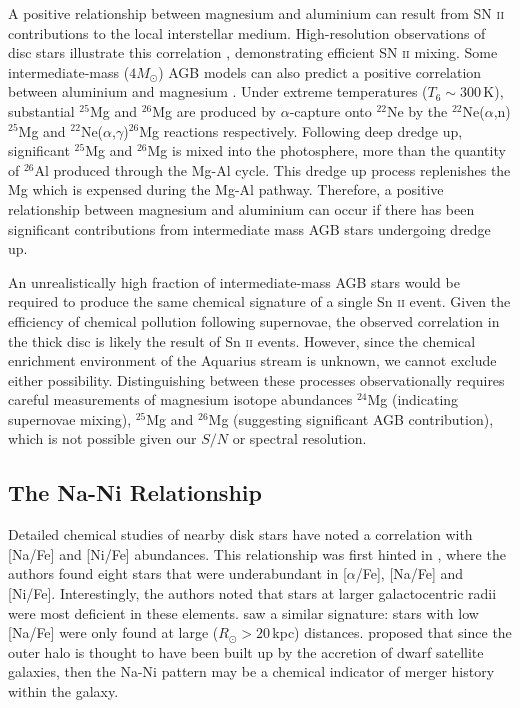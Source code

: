 \documentclass{emulateapj}
\begin{document}
A positive relationship between magnesium and aluminium can result from SN \textsc{ii} contributions to the local interstellar medium. High-resolution observations of disc stars illustrate this correlation \citep{bensby;venn}, demonstrating efficient SN \textsc{ii} mixing. Some intermediate-mass ($4M_\odot$) AGB models can also predict a positive correlation between aluminium and magnesium \citet{karakas;et-al}. Under extreme temperatures ($T_6 \sim 300$\,K), substantial $^{25}$Mg and $^{26}$Mg are produced by $\alpha$-capture onto $^{22}$Ne by the $^{22}$Ne($\alpha$,n)$^{25}$Mg and $^{22}$Ne($\alpha$,$\gamma$)$^{26}$Mg reactions respectively. Following deep dredge up, significant $^{25}$Mg and $^{26}$Mg is mixed into the photosphere, more than the quantity of $^{26}$Al produced through the Mg-Al cycle. This dredge up process replenishes the Mg which is expensed during the Mg-Al pathway. Therefore, a positive relationship between magnesium and aluminium can occur if there has been significant contributions from intermediate mass AGB stars undergoing dredge up. 



An unrealistically high fraction of intermediate-mass AGB stars would be required to produce the same chemical signature of a single Sn \textsc{ii} event. Given the efficiency of chemical pollution following supernovae, the observed correlation in the thick disc is likely the result of Sn \textsc{ii} events. However, since the chemical enrichment environment of the Aquarius stream is unknown, we cannot exclude either possibility. Distinguishing between these processes observationally requires careful measurements of magnesium isotope abundances $^{24}$Mg (indicating supernovae mixing), $^{25}$Mg and $^{26}$Mg (suggesting significant AGB contribution), which is not possible given our $S/N$ or spectral resolution.

\subsection{The Na-Ni Relationship}

Detailed chemical studies of nearby disk stars have noted a correlation with [Na/Fe] and [Ni/Fe] abundances. This relationship was first hinted in \citet{nissen;schuster_1997}, where the authors found eight stars that were underabundant in [$\alpha$/Fe], [Na/Fe] and [Ni/Fe]. Interestingly, the authors noted that stars at larger galactocentric radii were most deficient in these elements. \citet{fulbright_2000} saw a similar signature: stars with low [Na/Fe] were only found at large ($R_\odot > 20$\,kpc) distances. \citet{nissen;schuster_1997} proposed that since the outer halo is thought to have been built up by the accretion of dwarf satellite galaxies, then the Na-Ni pattern may be a chemical indicator of merger history within the galaxy.
\end{document}
